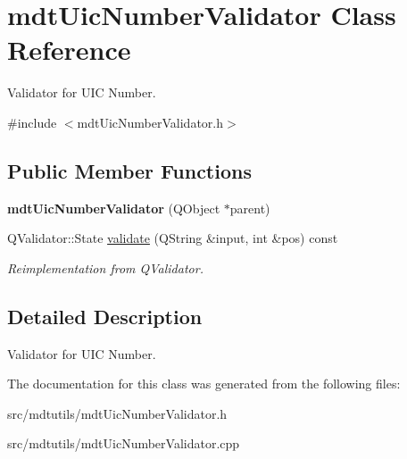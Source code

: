 \hypertarget{classmdt_uic_number_validator}{
\section{mdtUicNumberValidator Class Reference}
\label{classmdt_uic_number_validator}
}


Validator for UIC Number.  




{\ttfamily \#include $<$mdtUicNumberValidator.h$>$}

\subsection*{Public Member Functions}
\begin{DoxyCompactItemize}
\item 
\hypertarget{classmdt_uic_number_validator_afc666122b30492602463ef0ed0a9ace7}{
{\bfseries mdtUicNumberValidator} (QObject $\ast$parent)}
\label{classmdt_uic_number_validator_afc666122b30492602463ef0ed0a9ace7}

\item 
\hypertarget{classmdt_uic_number_validator_a974ac5a8918f4a2f949314d3bee07e40}{
QValidator::State \hyperlink{classmdt_uic_number_validator_a974ac5a8918f4a2f949314d3bee07e40}{validate} (QString \&input, int \&pos) const }
\label{classmdt_uic_number_validator_a974ac5a8918f4a2f949314d3bee07e40}

\begin{DoxyCompactList}\small\item\em Reimplementation from QValidator. \end{DoxyCompactList}\end{DoxyCompactItemize}


\subsection{Detailed Description}
Validator for UIC Number. 

The documentation for this class was generated from the following files:\begin{DoxyCompactItemize}
\item 
src/mdtutils/mdtUicNumberValidator.h\item 
src/mdtutils/mdtUicNumberValidator.cpp\end{DoxyCompactItemize}
